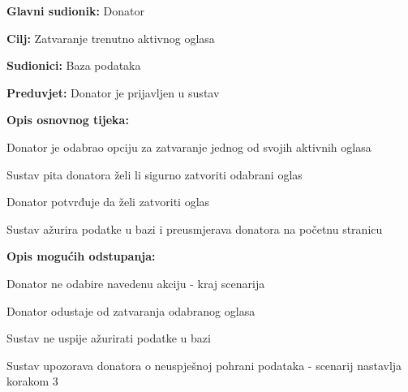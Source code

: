 					\noindent {}
					\begin{packed_item}
	
						\item \textbf{Glavni sudionik: }Donator
						\item  \textbf{Cilj:} Zatvaranje trenutno aktivnog oglasa
						\item  \textbf{Sudionici:} Baza podataka
						\item  \textbf{Preduvjet:} Donator je prijavljen u sustav
						\item  \textbf{Opis osnovnog tijeka:}
						
						\item[] \begin{packed_enum}
							\item Donator je odabrao opciju za zatvaranje jednog od svojih aktivnih oglasa
							\item Sustav pita donatora želi li sigurno zatvoriti odabrani oglas
							\item Donator potvrđuje da želi zatvoriti oglas
							\item Sustav ažurira podatke u bazi i preusmjerava donatora na početnu stranicu
						\end{packed_enum}

						\item  \textbf{Opis mogućih odstupanja:}

						\item[] \begin{packed_item}
							\item[1.a] Donator ne odabire navedenu akciju - kraj scenarija
							\item[3.a] Donator odustaje od zatvaranja odabranog oglasa
							\item[4.a] Sustav ne uspije ažurirati podatke u bazi
							\item[] \begin{packed_enum}
								\item Sustav upozorava donatora o neuspješnoj pohrani podataka - scenarij nastavlja korakom 3
							\end{packed_enum}					
						\end{packed_item}
					\end{packed_item}	

